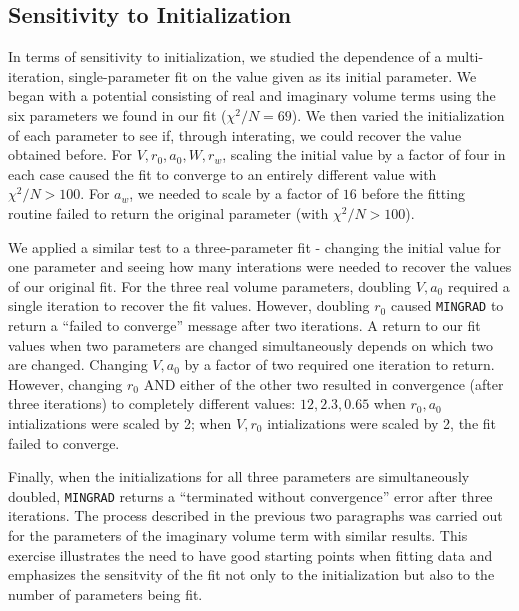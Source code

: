\documentclass[]{scrartcl}
\begin{document}
\subsection*{Sensitivity to Initialization}

In terms of sensitivity to initialization, we studied the dependence of a multi-iteration, single-parameter fit on the value given as its initial parameter. We began with a potential consisting of real and imaginary volume terms using the six parameters we found in our fit ($\chi ^2 /N = 69$). We then varied the initialization of each parameter to see if, through interating, we could recover the value obtained before. For $V,r_0,a_0,W,r_w$, scaling the initial value by a factor of four in each case caused the fit to converge to an entirely different value with $\chi ^2 /N>100$. For $a_w$, we needed to scale by a factor of $16$ before the fitting routine failed to return the original parameter (with $\chi ^2 /N>100$).

We applied a similar test to a three-parameter fit - changing the initial value for one parameter and seeing how many interations were needed to recover the values of our original fit. For the three real volume parameters, doubling $V,a_0$ required a single iteration to recover the fit values. However, doubling $r_0$ caused \texttt{MINGRAD} to return a ``failed to converge'' message after two iterations. A return to our fit values when two parameters are changed simultaneously depends on which two are changed. Changing $V,a_0$ by a factor of two required one iteration to return. However, changing $r_0$ AND either of the other two resulted in convergence (after three iterations) to completely different values: $12,2.3,0.65$ when $r_0,a_0$ intializations were scaled by 2; when $V,r_0$ intializations were scaled by 2, the fit failed to converge.

Finally, when the initializations for all three parameters are simultaneously doubled, \texttt{MINGRAD} returns a ``terminated without convergence'' error after three iterations. The process described in the previous two paragraphs was carried out for the parameters of the imaginary volume term with similar results. This exercise illustrates the need to have good starting points when fitting data and emphasizes the sensitvity of the fit not only to the initialization but also to the number of parameters being fit.

\end{document}
